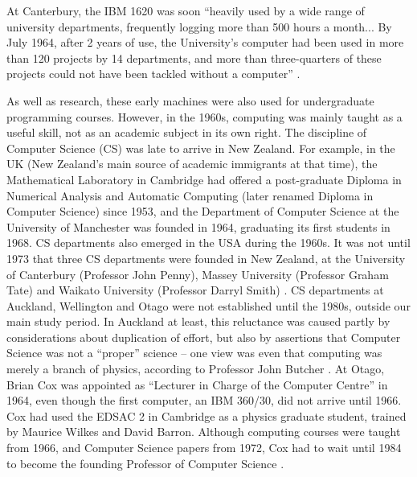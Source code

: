 \documentclass{IEEEcsmag}
\begin{document}
At Canterbury, the IBM 1620 was soon “heavily used by a wide range of university departments, frequently logging more than 500 hours a month... By July
1964, after 2 years of use, the University’s computer had been used in more than 120 projects by 14 departments,
and more than three-quarters of these projects could not have been tackled without a computer” \cite{Dale-Canty2}.

As well as research, these early machines were also used for undergraduate programming courses. However, in the 1960s, computing was mainly taught as a useful skill, not as an academic subject in its own right. The discipline of Computer Science (CS) was late to arrive in New Zealand. For example, in the UK (New Zealand’s main source of academic immigrants at that time), the Mathematical Laboratory in Cambridge had offered a post-graduate Diploma in Numerical Analysis and Automatic Computing (later renamed Diploma in Computer Science) since 1953, and the Department of Computer Science at the University of Manchester was founded in 1964, graduating its first students in 1968. CS departments also emerged in the USA during the 1960s. It was not until 1973 that three CS departments were founded in New Zealand, at the University of Canterbury (Professor John Penny),  Massey University (Professor Graham Tate) and Waikato University (Professor Darryl Smith) \cite{Bell, Waikato-50}.
CS departments at Auckland, Wellington and Otago were not established until the 1980s, outside our main study period. In Auckland at least, this reluctance was caused partly by considerations about duplication of effort, but also by assertions that Computer Science was not a “proper” science -- one view was even that computing was merely a branch of physics, according to Professor John Butcher \cite{Butcher-private}. At Otago, Brian Cox was appointed as “Lecturer in Charge of the Computer Centre” in 1964, even though the first computer, an IBM 360/30, did not arrive until 1966. Cox had used the EDSAC 2 in Cambridge as a physics graduate student, trained by Maurice Wilkes and David Barron. Although computing courses were taught from 1966, and Computer Science papers from 1972, Cox had to wait until 1984 to become the founding Professor of Computer Science \cite{Otago-history}.
\cbstart
\vspace*{-8pt}
\end{document}
